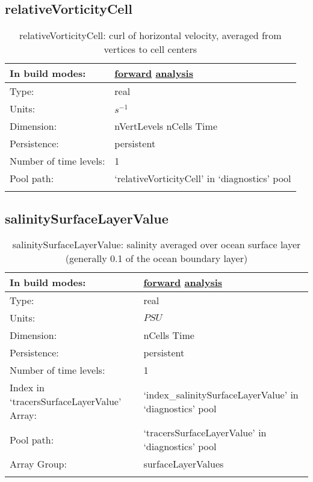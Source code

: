 \subsection[relativeVorticityCell]{relativeVorticityCell}
\label{subsec:var_sec_diagnostics_relativeVorticityCell}
\begin{center}
\begin{longtable}{| p{2.0in} | p{4.0in} |}
        \hline 
        In build modes: & \hyperref[subsec:forward_var_tab_diagnostics]{forward} \hyperref[subsec:analysis_var_tab_diagnostics]{analysis} \\
        \hline 
        Type: & real \\
        \hline 
        Units: & $s^{-1}$ \\
        \hline 
        Dimension: & nVertLevels nCells Time \\
        \hline 
        Persistence: & persistent \\
        \hline 
        Number of time levels: & 1 \\
        \hline 
            Pool path: & `relativeVorticityCell' in `diagnostics' pool \\
		 \hline 
    \caption{relativeVorticityCell: curl of horizontal velocity, averaged from vertices to cell centers}
\end{longtable}
\end{center}
\subsection[salinitySurfaceLayerValue]{salinitySurfaceLayerValue}
\label{subsec:var_sec_diagnostics_salinitySurfaceLayerValue}
\begin{center}
\begin{longtable}{| p{2.0in} | p{4.0in} |}
        \hline 
        In build modes: & \hyperref[subsec:forward_var_tab_diagnostics]{forward} \hyperref[subsec:analysis_var_tab_diagnostics]{analysis} \\
        \hline 
        Type: & real \\
        \hline 
        Units: & $PSU$ \\
        \hline 
        Dimension: & nCells Time \\
        \hline 
        Persistence: & persistent \\
        \hline 
        Number of time levels: & 1 \\
        \hline 
		 Index in `tracersSurfaceLayerValue' Array: & `index\_salinitySurfaceLayerValue' in `diagnostics' pool \\
		 \hline 
            Pool path: & `tracersSurfaceLayerValue' in `diagnostics' pool \\
		 \hline 
		 Array Group: & surfaceLayerValues \\
		 \hline 
    \caption{salinitySurfaceLayerValue: salinity averaged over ocean surface layer (generally 0.1 of the ocean boundary layer)}
\end{longtable}
\end{center}
